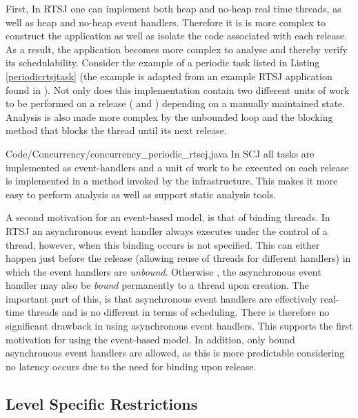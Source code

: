 First, In RTSJ one can implement both heap and no-heap real time threads, as well as heap and no-heap event handlers. Therefore it is is more complex to construct the application as well as isolate the code associated with each release. As a result, the application becomes more complex to analyse and thereby verify its schedulability. Consider the example of a periodic task listed in Listing \ref{periodicrtsjtask} (the example is adapted from an example RTSJ application found in \cite{Schoeberl:2007:GCS:1288940.1288953}). Not only does this implementation contain two different units of work to be performed on a release ( and ) depending on a manually maintained state. Analysis is also made more complex by the unbounded loop and the blocking  method that blocks the thread until its next release.

{Code/Concurrency/concurrency_periodic_rtscj.java}
In SCJ all tasks are implemented as event-handlers and a unit of work to be executed on each release is implemented in a  method invoked by the infrastructure. This makes it more easy to perform analysis as well as support static analysis tools.

A second motivation for an event-based model, is that of binding threads. In RTSJ an asynchronous event handler always executes under the control of a thread, however, when this binding occurs is not specified. This can either happen just before the release (allowing reuse of threads for different handlers) in which the event handlers are \textit{unbound}. Otherwise , the asynchronous event handler may also be \textit{bound} permanently to a thread upon creation. The important part of this, is that asynchronous event handlers are effectively real-time threads and is no different in terms of scheduling. There is therefore no significant drawback in using asynchronous event handlers. This supports the first motivation for using the event-based model. In addition, only bound asynchronous event handlers are allowed, as this is more predictable considering no latency occurs due to the need for binding upon release.




\subsection{Level Specific Restrictions} %
\label{sub:level_specific_restrictions}





